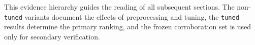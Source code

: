This evidence hierarchy guides the reading of all subsequent sections. The non-\texttt{tuned} variants document the effects of preprocessing and tuning, the \texttt{tuned} results determine the primary ranking, and the frozen corroboration set is used only for secondary verification.

